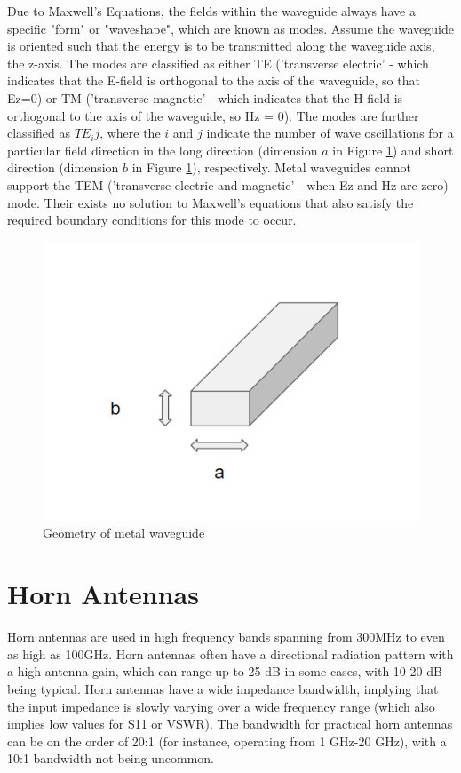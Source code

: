 \documentclass[a4paper,12pt]{report}
\begin{document}
Due to Maxwell's Equations,
the fields within the waveguide always have a specific "form" or "waveshape",
which are known as modes.
Assume the waveguide is oriented such that the energy is to be transmitted along the waveguide axis, the z-axis.
The modes are classified as either TE
('transverse electric' - which indicates that the E-field is orthogonal to the axis of the waveguide, so that Ez=0)
or TM ('transverse magnetic' - which indicates that the H-field is orthogonal to the axis of the waveguide, so Hz = 0).
The modes are further classified as $TE_ij$,
where the $i$ and $j$ indicate the number of wave oscillations for a particular
field direction in the long direction (dimension $a$ in Figure \ref{fig:metal_waveguide_geometry})
and short direction (dimension $b$ in Figure \ref{fig:metal_waveguide_geometry}), respectively.
Metal waveguides cannot support the TEM
('transverse electric and magnetic' - when Ez and Hz are zero) mode.
Their exists no solution to Maxwell's equations
that also satisfy the required boundary conditions for this mode to occur.

\begin{figure}
  \begin{center}
    \includegraphics[clip, keepaspectratio, width=0.5\linewidth]{img/metal_waveguide_with_dims.png}
    \caption{Geometry of metal waveguide}
    \label{fig:metal_waveguide_geometry}
  \end{center}
\end{figure}

\section{Horn Antennas}

Horn antennas are used in high frequency bands spanning from 300MHz
to even as high as 100GHz.
Horn antennas often have a directional radiation pattern with a high antenna gain,
which can range up to 25 dB in some cases, with 10-20 dB being typical.
Horn antennas have a wide impedance bandwidth,
implying that the input impedance is slowly varying over a wide frequency range (which also implies low values for S11 or VSWR). The bandwidth for practical horn antennas can be on the order of 20:1 (for instance, operating from 1 GHz-20 GHz),
with a 10:1 bandwidth not being uncommon.
\end{document}

